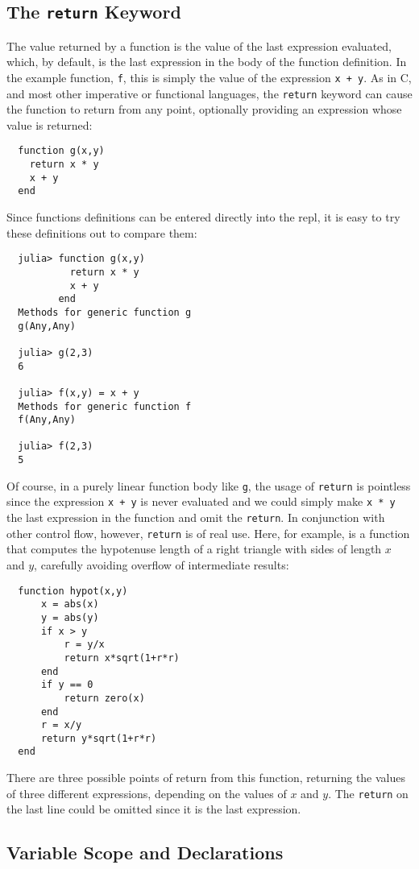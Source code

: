\documentclass{article}
\begin{document}
\subsection{The \texttt{return} Keyword}

The value returned by a function is the value of the last expression evaluated, which, by default, is the last expression in the body of the function definition.
In the example function, \verb|f|, this is simply the value of the expression \verb|x + y|.
As in C, and most other imperative or functional languages, the \verb|return| keyword can cause the function to return from any point, optionally providing an expression whose value is returned:
\begin{verbatim}
  function g(x,y)
    return x * y
    x + y
  end
\end{verbatim}
Since functions definitions can be entered directly into the repl, it is easy to try these definitions out to compare them:
\begin{verbatim}
  julia> function g(x,y)
           return x * y
           x + y
         end
  Methods for generic function g
  g(Any,Any)

  julia> g(2,3)
  6

  julia> f(x,y) = x + y
  Methods for generic function f
  f(Any,Any)

  julia> f(2,3)
  5
\end{verbatim}
Of course, in a purely linear function body like \verb|g|, the usage of \verb|return| is pointless since the expression \verb|x + y| is never evaluated and we could simply make \verb|x * y| the last expression in the function and omit the \verb|return|.
In conjunction with other control flow, however, \verb|return| is of real use.
Here, for example, is a function that computes the hypotenuse length of a right triangle with sides of length $x$ and $y$, carefully avoiding overflow of intermediate results:
\begin{verbatim}
  function hypot(x,y)
      x = abs(x)
      y = abs(y)
      if x > y
          r = y/x
          return x*sqrt(1+r*r)
      end
      if y == 0
          return zero(x)
      end
      r = x/y
      return y*sqrt(1+r*r)
  end
\end{verbatim}
There are three possible points of return from this function, returning the values of three different expressions, depending on the values of $x$ and $y$.
The \verb|return| on the last line could be omitted since it is the last expression.

\subsection{Variable Scope and Declarations}
\end{document}
